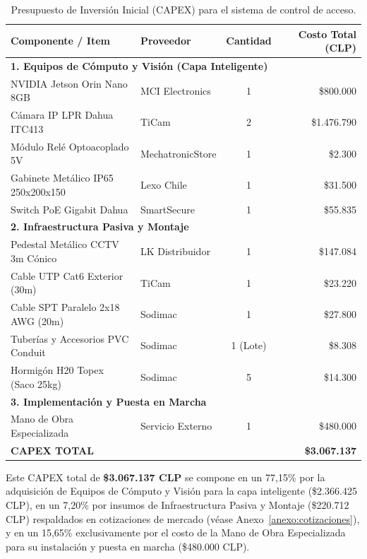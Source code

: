 \begin{table}[H]
    \centering
    \small
    \setlength{\tabcolsep}{4.5pt}
    \caption{Presupuesto de Inversión Inicial (CAPEX) para el sistema de control de acceso.}
    \begin{tabular}{|p{5.2cm}|p{3.2cm}|c|r|}
        \hline
        \textbf{Componente / Item} & \textbf{Proveedor} & \textbf{Cantidad} & \textbf{Costo Total (CLP)} \\ \hline
        \multicolumn{4}{|l|}{\textbf{1. Equipos de Cómputo y Visión (Capa Inteligente)}} \\ \hline
        NVIDIA Jetson Orin Nano 8GB & MCI Electronics & 1 & \$800.000 \\ \hline
        Cámara IP LPR Dahua ITC413 & TiCam & 2 & \$1.476.790 \\ \hline
        Módulo Relé Optoacoplado 5V & MechatronicStore & 1 & \$2.300 \\ \hline
        Gabinete Metálico IP65 250x200x150 & Lexo Chile & 1 & \$31.500 \\ \hline
        Switch PoE Gigabit Dahua & SmartSecure & 1 & \$55.835 \\ \hline
        \multicolumn{4}{|l|}{\textbf{2. Infraestructura Pasiva y Montaje}} \\ \hline
        Pedestal Metálico CCTV 3m Cónico & LK Distribuidor & 1 & \$147.084 \\ \hline
        Cable UTP Cat6 Exterior (30m) & TiCam & 1 & \$23.220 \\ \hline
        Cable SPT Paralelo 2x18 AWG (20m) & Sodimac & 1 & \$27.800 \\ \hline
        Tuberías y Accesorios PVC Conduit & Sodimac & 1 (Lote) & \$8.308 \\ \hline
        Hormigón H20 Topex (Saco 25kg) & Sodimac & 5 & \$14.300 \\ \hline
        \multicolumn{4}{|l|}{\textbf{3. Implementación y Puesta en Marcha}} \\ \hline
        Mano de Obra Especializada & Servicio Externo & 1 & \$480.000 \\ \hline
        \hline
        \multicolumn{3}{|l|}{\textbf{CAPEX TOTAL}} & \textbf{\$3.067.137} \\ \hline
    \end{tabular}
    \label{tab:capex}
\end{table}

Este CAPEX total de \textbf{\$3.067.137 CLP} se compone en un 77,15\% por la adquisición de Equipos de Cómputo y Visión para la capa inteligente (\$2.366.425 CLP), en un 7,20\% por insumos de Infraestructura Pasiva y Montaje (\$220.712 CLP) respaldados en cotizaciones de mercado (véase Anexo~\ref{anexo:cotizaciones}), y en un 15,65\% exclusivamente por el costo de la Mano de Obra Especializada para su instalación y puesta en marcha (\$480.000 CLP).

